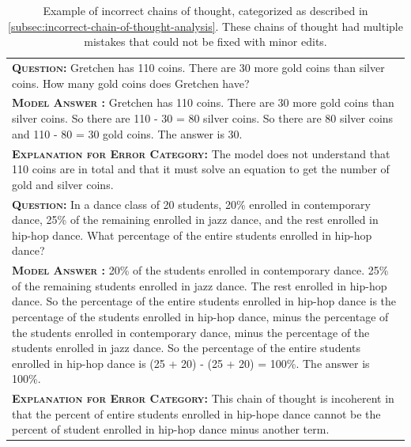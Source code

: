 \begingroup
\begin{table}[ht]
    \caption{
    Example of incorrect chains of thought, categorized as described in \cref{subsec:incorrect-chain-of-thought-analysis}. These chains of thought had multiple mistakes that could not be fixed with minor edits.
    }
    \vspace{1mm}
    \centering
    \small
    \begin{tabular}{p{\linewidth}}
        \toprule
        \vspace{-2mm}
        \textbf{\textsc{Question:}} Gretchen has 110 coins. There are 30 more gold coins than silver coins. How many gold coins does Gretchen have? \\
        \vspace{-1mm}
        \textbf{\textsc{Model Answer \color{blue}{(incorrect; semantic understanding error)}:}} Gretchen has 110 coins. There are 30 more gold coins than silver coins. So there are 110 - 30 = 80 silver coins. So there are 80 silver coins and 110 - 80 = 30 gold coins. The answer is 30. \color{blue}{\xmark} \\
        \vspace{-1mm}
        \textbf{\textsc{Explanation for Error Category:}} The model does not understand that 110 coins are in total and that it must solve an equation to get the number of gold and silver coins. \\
        \midrule
        \vspace{-2mm}
        \textbf{\textsc{Question:}} In a dance class of 20 students, 20\% enrolled in contemporary dance, 25\% of the remaining enrolled in jazz dance, and the rest enrolled in hip-hop dance. What percentage of the entire students enrolled in hip-hop dance? \\
        \vspace{-1mm}
        \textbf{\textsc{Model Answer \color{blue}{(incorrect; incoherent chain of thought error)}:}} 20\% of the students enrolled in contemporary dance. 25\% of the remaining students enrolled in jazz dance. The rest enrolled in hip-hop dance. So {\color{blue}the percentage of the entire students enrolled in hip-hop dance is the percentage of the students enrolled in hip-hop dance, minus} the percentage of the students enrolled in contemporary dance, minus the percentage of the students enrolled in jazz dance. So the percentage of the entire students enrolled in hip-hop dance is (25 + 20) - (25 + 20) = 100\%. The answer is 100\%.  \color{blue}{\xmark} \\
        \vspace{-1mm}
        \textbf{\textsc{Explanation for Error Category:}} This chain of thought is incoherent in that the percent of entire students enrolled in hip-hope dance cannot be the percent of student enrolled in hip-hop dance minus another term. \\
        \bottomrule
    \end{tabular}
    \label{tab:appendix-gsm8k-incorrect-examples-cont}
\end{table}
\endgroup